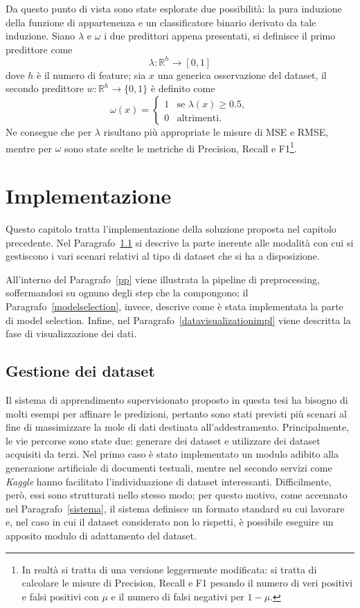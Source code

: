 \documentclass[12pt]{report}
\theoremstyle{definition}
\begin{document}
Da questo punto di vista sono state esplorate due possibilità: la pura induzione della funzione di appartenenza e un classificatore binario derivato da tale induzione.
Siano $\lambda$ e $\omega$ i due predittori appena presentati, si definisce il primo predittore come
\begin{equation}
    \lambda: \mathbb{R}^h \rightarrow [0,1]
\end{equation}
dove $h$ è il numero di feature; sia $x$ una generica osservazione del dataset, il secondo predittore $w: \mathbb R^h \rightarrow \{ 0, 1 \}$ è definito come
\begin{equation}
    \omega(x) = \begin{cases} 1 & \mbox{se } \lambda(x) \geq 0.5, \\ 0 & \mbox{altrimenti.} \end{cases}
\end{equation}
Ne consegue che per $\lambda$ risultano più appropriate le misure di MSE e RMSE, mentre per $\omega$ sono state scelte le metriche di Precision, Recall e F1\footnote{In realtà si tratta di una versione leggermente modificata: si tratta di calcolare le misure di Precision, Recall e F1 pesando il numero di veri positivi e falsi positivi con $\mu$ e il numero di falsi negativi per $1-\mu$.}.

\chapter{Implementazione}
\label{Capitolo 3}
\onehalfspacing
Questo capitolo tratta l'implementazione della soluzione proposta nel capitolo precedente. Nel Paragrafo~\ref{datasethandle} si descrive la parte inerente alle modalità con cui si gestiscono i vari scenari relativi al tipo di dataset che si ha a disposizione.

All'interno del Paragrafo~\ref{pp} viene illustrata la pipeline di preprocessing, soffermandosi su ognuno degli step che la compongono; il Paragrafo~\ref{modelselection}, invece, descrive come è stata implementata la parte di model selection.
Infine, nel Paragrafo~\ref{datavisualizationimpl} viene descritta la fase di visualizzazione dei dati.

\section{Gestione dei dataset}\label{datasethandle}
Il sistema di apprendimento supervisionato proposto in questa tesi ha bisogno di molti esempi per affinare le predizioni, pertanto sono stati previsti più scenari al fine di massimizzare la mole di dati destinata all'addestramento. Principalmente, le vie percorse sono state due: generare dei dataset e utilizzare dei dataset acquisiti da terzi.
Nel primo caso è stato implementato un modulo adibito alla generazione artificiale di documenti testuali, mentre nel secondo servizi come \textit{Kaggle} hanno facilitato l'individuazione di dataset interessanti. Difficilmente, però, essi sono strutturati nello stesso modo; per questo motivo, come accennato nel Paragrafo~\ref{sistema}, il sistema definisce un formato standard su cui lavorare e, nel caso in cui il dataset considerato non lo rispetti, è possibile eseguire un apposito modulo di adattamento del dataset.
\end{document}
